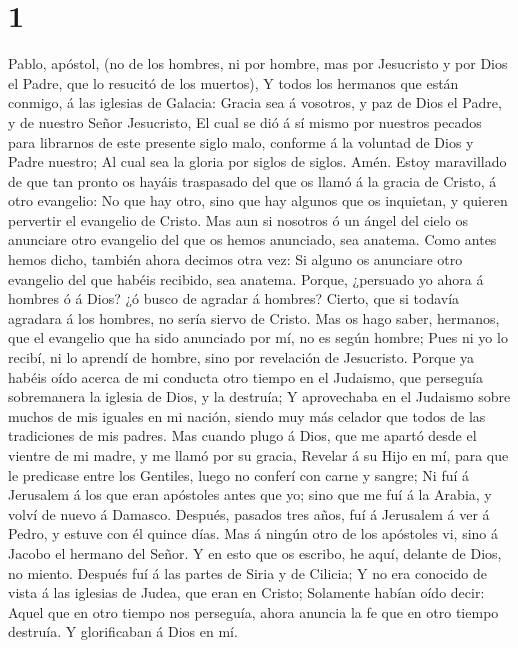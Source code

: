 \hypertarget{section}{%
\section{1}\label{section}}

 Pablo, apóstol, (no de los hombres, ni por hombre, mas
por Jesucristo y por Dios el Padre, que lo resucitó de los muertos),
 Y todos los hermanos que están conmigo, á las iglesias de
Galacia:  Gracia sea á vosotros, y paz de Dios el Padre, y
de nuestro Señor Jesucristo,  El cual se dió á sí mismo
por nuestros pecados para librarnos de este presente siglo malo,
conforme á la voluntad de Dios y Padre nuestro;  Al cual
sea la gloria por siglos de siglos. Amén.  Estoy
maravillado de que tan pronto os hayáis traspasado del que os llamó á la
gracia de Cristo, á otro evangelio:  No que hay otro, sino
que hay algunos que os inquietan, y quieren pervertir el evangelio de
Cristo.  Mas aun si nosotros ó un ángel del cielo os
anunciare otro evangelio del que os hemos anunciado, sea anatema.
 Como antes hemos dicho, también ahora decimos otra vez:
Si alguno os anunciare otro evangelio del que habéis recibido, sea
anatema.  Porque, ¿persuado yo ahora á hombres ó á Dios?
¿ó busco de agradar á hombres? Cierto, que si todavía agradara á los
hombres, no sería siervo de Cristo.  Mas os hago saber,
hermanos, que el evangelio que ha sido anunciado por mí, no es según
hombre;  Pues ni yo lo recibí, ni lo aprendí de hombre,
sino por revelación de Jesucristo.  Porque ya habéis oído
acerca de mi conducta otro tiempo en el Judaismo, que perseguía
sobremanera la iglesia de Dios, y la destruía;  Y
aprovechaba en el Judaismo sobre muchos de mis iguales en mi nación,
siendo muy más celador que todos de las tradiciones de mis padres.
 Mas cuando plugo á Dios, que me apartó desde el vientre
de mi madre, y me llamó por su gracia,  Revelar á su Hijo
en mí, para que le predicase entre los Gentiles, luego no conferí con
carne y sangre;  Ni fuí á Jerusalem á los que eran
apóstoles antes que yo; sino que me fuí á la Arabia, y volví de nuevo á
Damasco.  Después, pasados tres años, fuí á Jerusalem á
ver á Pedro, y estuve con él quince días.  Mas á ningún
otro de los apóstoles vi, sino á Jacobo el hermano del Señor.
 Y en esto que os escribo, he aquí, delante de Dios, no
miento.  Después fuí á las partes de Siria y de Cilicia;
 Y no era conocido de vista á las iglesias de Judea, que
eran en Cristo;  Solamente habían oído decir: Aquel que
en otro tiempo nos perseguía, ahora anuncia la fe que en otro tiempo
destruía.  Y glorificaban á Dios en mí.

